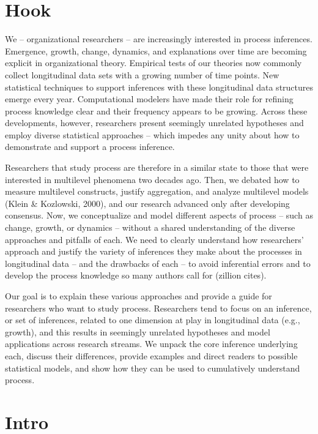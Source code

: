 \documentclass[english,,man]{apa6}
\theoremstyle{definition}
\theoremstyle{definition}
\theoremstyle{definition}
\theoremstyle{remark}
\begin{document}
\hypertarget{hook}{%
\section{Hook}\label{hook}}

We -- organizational researchers -- are increasingly interested in
process inferences. Emergence, growth, change, dynamics, and
explanations over time are becoming explicit in organizational theory.
Empirical tests of our theories now commonly collect longitudinal data
sets with a growing number of time points. New statistical techniques to
support inferences with these longitudinal data structures emerge every
year. Computational modelers have made their role for refining process
knowledge clear and their frequency appears to be growing. Across these
developments, however, researchers present seemingly unrelated
hypotheses and employ diverse statistical approaches -- which impedes
any unity about how to demonstrate and support a process inference.

Researchers that study process are therefore in a similar state to those
that were interested in multilevel phenomena two decades ago. Then, we
debated how to measure multilevel constructs, justify aggregation, and
analyze multilevel models (Klein \& Kozlowski, 2000), and our research
advanced only after developing consensus. Now, we conceptualize and
model different aspects of process -- such as change, growth, or
dynamics -- without a shared understanding of the diverse approaches and
pitfalls of each. We need to clearly understand how researchers'
approach and justify the variety of inferences they make about the
processes in longitudinal data -- and the drawbacks of each -- to avoid
inferential errors and to develop the process knowledge so many authors
call for (zillion cites).

Our goal is to explain these various approaches and provide a guide for
researchers who want to study process. Researchers tend to focus on an
inference, or set of inferences, related to one dimension at play in
longitudinal data (e.g., growth), and this results in seemingly
unrelated hypotheses and model applications across research streams. We
unpack the core inference underlying each, discuss their differences,
provide examples and direct readers to possible statistical models, and
show how they can be used to cumulatively understand process.

\hypertarget{intro}{%
\section{Intro}\label{intro}}
\end{document}
